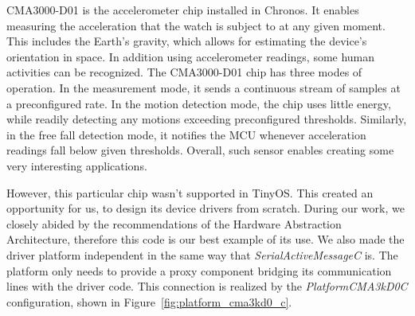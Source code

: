 CMA3000-D01 is the accelerometer chip installed in Chronos. It enables measuring the acceleration that the watch is subject to at any given moment. This includes the Earth's gravity, which allows for estimating the device's orientation in space. In addition using accelerometer readings, some human activities can be recognized. The CMA3000-D01 chip has three modes of operation. In the measurement mode, it sends a continuous stream of samples at a preconfigured rate. In the motion detection mode, the chip uses little energy, while readily detecting any motions exceeding preconfigured thresholds. Similarly, in the free fall detection mode, it notifies the MCU whenever acceleration readings fall below given thresholds. Overall, such sensor enables creating some very interesting applications.

However, this particular chip wasn't supported in TinyOS. This created an opportunity for us, to design its device drivers from scratch. During our work, we closely abided by the recommendations of the Hardware Abstraction Architecture, therefore this code is our best example of its use. We also made the driver platform independent in the same way that \emph{SerialActiveMessageC} is. The platform only needs to provide a proxy component bridging its communication lines with the driver code.  This connection is realized by the \emph{PlatformCMA3kD0C} configuration, shown in Figure~\ref{fig:platform_cma3kd0_c}.

